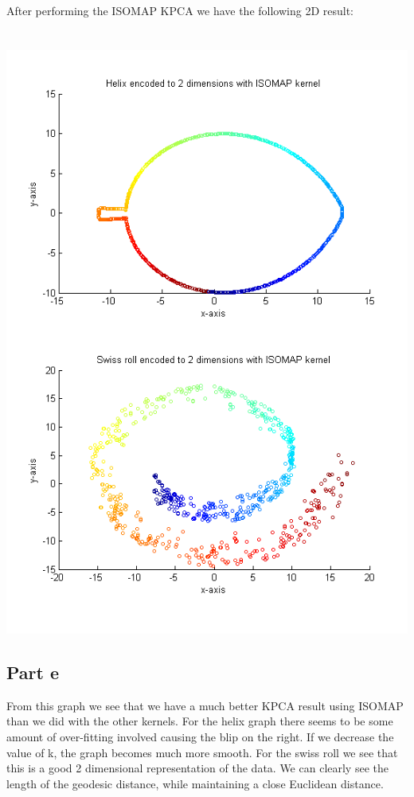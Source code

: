 \documentclass[paper=a4, fontsize=11pt]{scrartcl} %
\numberwithin{equation}{section} %
\numberwithin{figure}{section} %
\numberwithin{table}{section} %
\begin{document}
	\\\\\\
	After performing the ISOMAP KPCA we have the following 2D result:
	\\\\\\
	\hspace*{-3cm}\includegraphics[]{isomap}
	\subsection{Part e}
	From this graph we see that we have a much better KPCA result using ISOMAP than we did with the other kernels. For the helix graph there seems to be some amount of over-fitting involved causing the blip on the right. If we decrease the value of k, the graph becomes much more smooth. For the swiss roll we see that this is a good 2 dimensional representation of the data. We can clearly see the length of the geodesic distance, while maintaining a close Euclidean distance.
	
\end{document}
